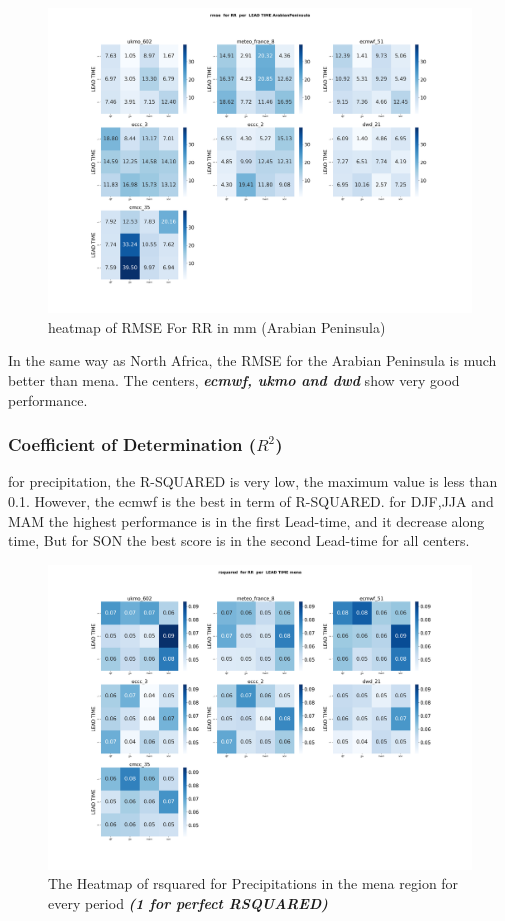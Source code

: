\begin{figure}[H]
\centering
\includegraphics[scale=0.3]{plots/det/rmse/rmse_RR_ArabianPeninsula.png}
\caption{heatmap of RMSE For RR in mm (Arabian Peninsula)}
\end{figure}

In the same way as North Africa, the RMSE for the Arabian Peninsula is much better than mena. The centers, \textbf{\textit{ecmwf, ukmo and dwd}} show very good performance.

\subsubsection{Coefficient of Determination (\( R^2 \))}
for precipitation, the R-SQUARED is very low, the maximum value is less than 0.1. However, the ecmwf is the best in term of R-SQUARED. for DJF,JJA and MAM the highest performance is in the first Lead-time, and it decrease along time, But for SON the best score is in the second Lead-time for all centers.
\begin{figure}[H]
	\centering
	\includegraphics[scale=0.25]{plots/det/rsquared/rsquared_RR_mena.png}
	\caption{The Heatmap of rsquared for Precipitations in the mena region for every period \textbf{\textit{(1 for perfect RSQUARED)} }}
\end{figure}


